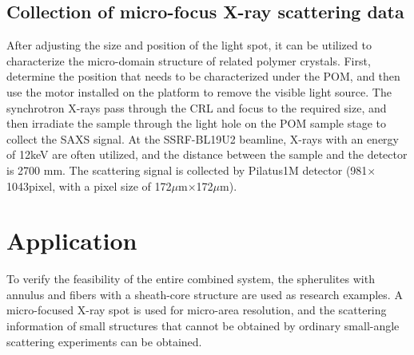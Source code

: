 \documentclass{Head}
\begin{document}
\subsection{Collection of micro-focus X-ray scattering data}
After adjusting the size and position of the light spot, it can be utilized to characterize the micro-domain structure of related polymer crystals.
First, determine the position that needs to be characterized under the POM, and then use the motor installed on the platform to remove the visible light source.
The synchrotron X-rays pass through the CRL and focus to the required size, and then irradiate the sample through the light hole on the POM sample stage to collect the SAXS signal.
At the SSRF-BL19U2 beamline, X-rays with an energy of 12keV are often utilized, and the distance between the sample and the detector is 2700 mm.
The scattering signal is collected by Pilatus1M detector (981$\times$1043pixel, with a pixel size of 172$\mu$m$\times$172$\mu$m).


\section{Application}
To verify the feasibility of the entire combined system, the spherulites with annulus and fibers with a sheath-core structure are used as research examples.
A micro-focused X-ray spot is used for micro-area resolution, and the scattering information of small structures that cannot be obtained by ordinary small-angle scattering experiments can be obtained.
\end{document}

